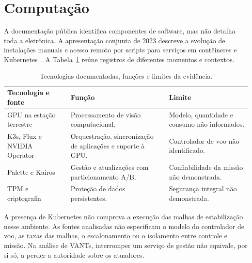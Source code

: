 \section{Computação}

A documentação pública identifica componentes de software, mas não detalha toda a eletrônica. A apresentação conjunta de 2023 descreve a evolução de instalações manuais e acesso remoto por scripts para serviços em contêineres e Kubernetes~\cite{oliveira2023tevel}. A Tabela~\ref{tab:tecnologias_documentadas} reúne registros de diferentes momentos e contextos.

\begin{table}[!htb]
    \centering
    \caption{Tecnologias documentadas, funções e limites da evidência.}
    \label{tab:tecnologias_documentadas}
    \small
    \setlength{\tabcolsep}{5pt}
    \renewcommand{\arraystretch}{1.10}

    \begin{tabularx}{\textwidth}{@{}
        >{\raggedright\arraybackslash}p{}
        >{\raggedright\arraybackslash}p{}
        >{\raggedright\arraybackslash}X
        @{}}
        \hline
        \textbf{Tecnologia e fonte} &
        \textbf{Função} &
        \textbf{Limite} \\
        \hline

        GPU na estação terrestre~\cite{reeuwijk2025} &
        Processamento de visão computacional. &
        Modelo, quantidade e consumo não informados. \\
        \hline

        K3s, Flux e NVIDIA Operator~\cite{oliveira2023tevel} &
        Orquestração, sincronização de aplicações e suporte à GPU. &
        Controlador de voo não identificado. \\
        \hline

        Palette e Kairos~\cite{oliveira2023tevel} &
        Gestão e atualizações com particionamento A/B. &
        Confiabilidade da missão não demonstrada. \\
        \hline

        TPM e criptografia~\cite{oliveira2023tevel} &
        Proteção de dados persistentes. &
        Segurança integral não demonstrada. \\
        \hline

    \end{tabularx}
\end{table}

A presença de Kubernetes não comprova a execução das malhas de estabilização nesse ambiente. As fontes analisadas não especificam o modelo do controlador de voo, as taxas das malhas, o escalonamento ou o isolamento entre controle e missão. Na análise de \acp{VANT}, interromper um serviço de gestão não equivale, por si só, a perder a autoridade sobre os atuadores.